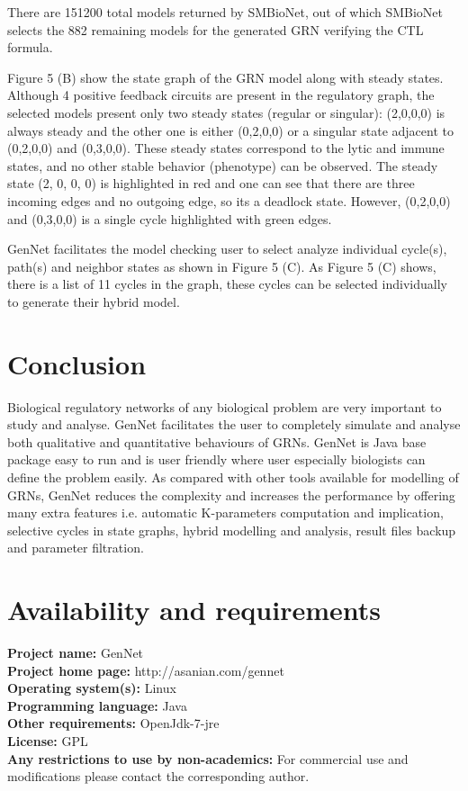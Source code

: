 \documentclass[twocolumn]{bmcart}%
\begin{document}
\par There are 151200 total models returned by SMBioNet, out of which SMBioNet selects the 882 remaining models for the generated GRN verifying the CTL formula.
\par Figure 5 (B) show the state graph of the GRN model along with steady states. Although 4 positive feedback circuits are present in the regulatory graph, the selected models present only two steady states (regular or singular): (2,0,0,0) is always steady and the other one is either (0,2,0,0) or a singular state adjacent to (0,2,0,0) and (0,3,0,0). These steady states correspond to the lytic and immune states, and no other stable behavior (phenotype) can be observed. The steady state (2, 0, 0, 0) is highlighted in red and one can see that there are three incoming edges and no outgoing edge, so its a deadlock state. However, (0,2,0,0) and (0,3,0,0) is a single cycle highlighted with green edges.
\par GenNet facilitates the model checking user to select analyze individual cycle(s), path(s) and neighbor states as shown in Figure 5 (C). As Figure 5 (C) shows, there is a list of 11 cycles in the graph, these cycles can be selected individually to generate their hybrid model.
      
\section*{Conclusion}
Biological regulatory networks of any biological problem are very important to study and analyse. GenNet facilitates the user to completely simulate and analyse both qualitative and quantitative behaviours of GRNs. GenNet is Java base package easy to run and is user friendly where user especially biologists can define the problem easily. As compared with other tools available for modelling of GRNs, GenNet reduces the complexity and increases the performance by offering many extra features i.e. automatic K-parameters computation and implication, selective cycles in state graphs, hybrid modelling and analysis, result files backup and parameter filtration.
\section*{Availability and requirements}
\textbf{Project name:} GenNet
\\
\textbf{Project home page:} http://asanian.com/gennet
\\
\textbf{Operating system(s):} Linux
\\
\textbf{Programming language:} Java
\\
\textbf{Other requirements:} OpenJdk-7-jre
\\
\textbf{License:} GPL
\\
\textbf{Any restrictions to use by non-academics:} For commercial
use and modifications please contact the corresponding author.
\end{document}
